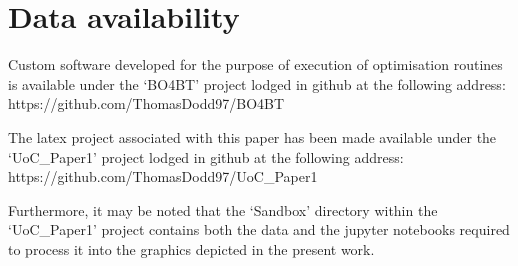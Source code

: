 \section{Data availability}
Custom software developed for the purpose of execution of optimisation
 routines is available under the `BO4BT' project lodged in github at
 the following address: https://github.com/ThomasDodd97/BO4BT

The latex project associated with this paper has been made available
 under the `UoC\_Paper1' project lodged in github at the following 
 address: https://github.com/ThomasDodd97/UoC\_Paper1

Furthermore, it may be noted that the `Sandbox' directory within the
 `UoC\_Paper1' project contains both the data and the jupyter notebooks
 required to process it into the graphics depicted in the present work.